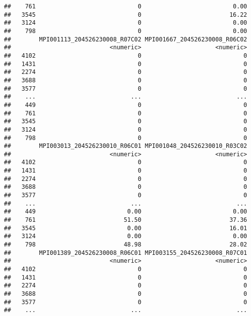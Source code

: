 \documentclass[
]{article}
\begin{document}
\begin{verbatim}
##    761                             0                          0.00
##   3545                             0                         16.22
##   3124                             0                          0.00
##    798                             0                          0.00
##        MPI001113_204526230008_R07C02 MPI001667_204526230008_R06C02
##                            <numeric>                     <numeric>
##   4102                             0                             0
##   1431                             0                             0
##   2274                             0                             0
##   3688                             0                             0
##   3577                             0                             0
##    ...                           ...                           ...
##    449                             0                             0
##    761                             0                             0
##   3545                             0                             0
##   3124                             0                             0
##    798                             0                             0
##        MPI003013_204526230010_R06C01 MPI001048_204526230010_R03C02
##                            <numeric>                     <numeric>
##   4102                             0                             0
##   1431                             0                             0
##   2274                             0                             0
##   3688                             0                             0
##   3577                             0                             0
##    ...                           ...                           ...
##    449                          0.00                          0.00
##    761                         51.50                         37.36
##   3545                          0.00                         16.01
##   3124                          0.00                          0.00
##    798                         48.98                         28.02
##        MPI001389_204526230008_R06C01 MPI003155_204526230008_R07C01
##                            <numeric>                     <numeric>
##   4102                             0                             0
##   1431                             0                             0
##   2274                             0                             0
##   3688                             0                             0
##   3577                             0                             0
##    ...                           ...                           ...

\end{verbatim}
\end{document}

